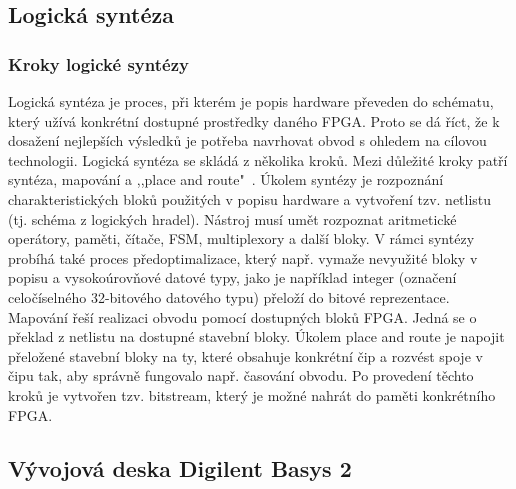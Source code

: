 \documentclass{report}
\begin{document}
\subsection{Logická syntéza}\label{sec:logickasynteza}
\subsubsection{Kroky logické syntézy}
Logická syntéza je proces, při kterém je popis hardware převeden do schématu, který užívá konkrétní dostupné prostředky daného FPGA. Proto se dá říct, že k dosažení nejlepších výsledků je potřeba navrhovat obvod s ohledem na cílovou technologii. Logická syntéza se skládá z několika kroků. Mezi důležité kroky patří syntéza, mapování a ,,place and route"~\cite{fpgastructure}. Úkolem syntézy je rozpoznání charakteristických bloků použitých v popisu hardware a vytvoření tzv. netlistu (tj. schéma z logických hradel). Nástroj musí umět rozpoznat aritmetické operátory, paměti, čítače, FSM, multiplexory a další bloky. V rámci syntézy probíhá také proces předoptimalizace, který např. vymaže nevyužité bloky v popisu a vysokoúrovňové datové typy, jako je například integer (označení celočíselného 32-bitového datového typu) přeloží do bitové reprezentace. Mapování řeší realizaci obvodu pomocí dostupných bloků FPGA. Jedná se o překlad z netlistu na dostupné stavební bloky. Úkolem place and route je napojit přeložené stavební bloky na ty, které obsahuje konkrétní čip a rozvést spoje v čipu tak, aby správně fungovalo např. časování obvodu. Po provedení těchto kroků je vytvořen tzv. bitstream, který je možné nahrát do paměti konkrétního FPGA.  
\subsection{Vývojová deska Digilent Basys 2}\label{sec:basys2}
\end{document}
